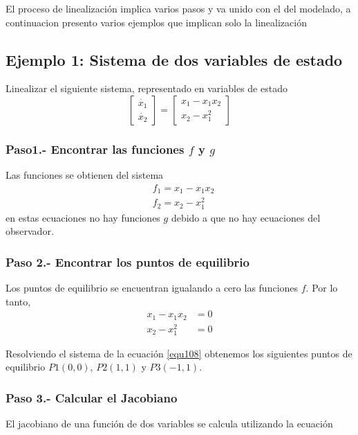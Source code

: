 \documentclass[12pt]{book}
\theoremstyle{definition}
\theoremstyle{remark}
\theoremstyle{plain}
\begin{document}
El proceso de linealización implica varios pasos y va unido con el del modelado, a continuacion presento varios ejemplos que implican solo la linealización

\subsection{Ejemplo 1: Sistema de dos variables de estado}
Linealizar el siguiente sistema, representado en variables de estado
\begin{equation}
\label{equ106}
\begin{bmatrix}
\dot{x_1}\\
\dot{x_2}
\end{bmatrix}
=
\begin{bmatrix}
x_1 - x_1 x_2\\
x_2 - x_1^2
\end{bmatrix}
\end{equation}

\subsubsection{Paso1.- Encontrar las funciones $f$ y $g$}
Las funciones se obtienen del sistema 
\begin{equation}
\label{equ107}
\begin{aligned}
& f_1 = x_1 - x_1 x_2\\
& f_2 = x_2 - x_1^2
\end{aligned}
\end{equation}
en estas ecuaciones no hay funciones $g$ debido a que no hay ecuaciones del observador.

\subsubsection{Paso 2.- Encontrar los puntos de equilibrio}
Los puntos de equilibrio se encuentran igualando a cero las funciones $f$. Por lo tanto, 
\begin{equation}
\label{equ108}
\begin{aligned}
 x_1 - x_1 x_2 &=0\\
x_2 - x_1^2 &=0
\end{aligned}
\end{equation}

Resolviendo el sistema de la ecuación \ref{equ108} obtenemos los siguientes puntos de equilibrio
$P1(0,0)$, $P2(1,1)$ y $P3(-1,1)$.

\subsubsection{Paso 3.- Calcular el Jacobiano}
El jacobiano de una función de dos variables se calcula utilizando la ecuación 
\end{document}
